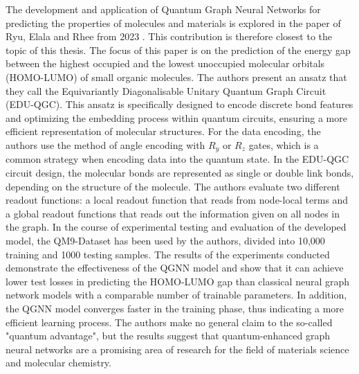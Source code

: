 The development and application of Quantum Graph Neural Networks for predicting the properties of molecules and materials is explored in the paper of Ryu, Elala and Rhee from 2023 \cite{ryu2023quantum}. This contribution is therefore closest to the topic of this thesis. The focus of this paper is on the prediction of the energy gap between the highest occupied and the lowest unoccupied molecular orbitals (HOMO-LUMO) of small organic molecules.  The authors present an ansatz that they call the Equivariantly Diagonalisable Unitary Quantum Graph Circuit (EDU-QGC). This ansatz is specifically designed to encode discrete bond features and optimizing the embedding process within quantum circuits, ensuring a more efficient representation of molecular structures. For the data encoding, the authors use the method of angle encoding with $R_y$ or $R_z$ gates, which is a common strategy when encoding data into the quantum state. In the EDU-QGC circuit design, the molecular bonds are represented as single or double link bonds, depending on the structure of the molecule. The authors evaluate two different readout functions: a local readout function that reads from node-local terms and a global readout functions that reads out the information given on all nodes in the graph.
In the course of experimental testing and evaluation of the developed model, the QM9-Dataset has been used by the authors, divided into 10,000 training and 1000 testing samples. The results of the experiments conducted demonstrate the effectiveness of the QGNN model and show that it can achieve lower test losses in predicting the HOMO-LUMO gap than classical neural graph network models with a comparable number of trainable parameters. In addition, the QGNN model converges faster in the training phase, thus indicating a more efficient learning process. The authors make no general claim to the so-called "quantum advantage", but the results suggest that quantum-enhanced graph neural networks are  a promising area of research for the field of materials science and molecular chemistry. \\

